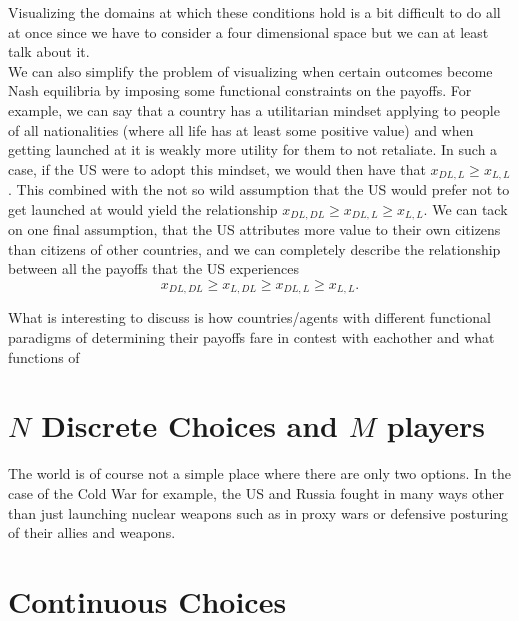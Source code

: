 \documentclass[11pt,english]{article}
\begin{document}
\noindent Visualizing the domains at which these conditions hold is a bit difficult to do all at once since we have to consider a four dimensional space but we can at least talk about it.\\

\noindent We can also simplify the problem of visualizing when certain outcomes become Nash equilibria by imposing some functional constraints on the payoffs. For example, we can say that a country has a utilitarian mindset applying to people of all nationalities (where all life has at least some positive value) and when getting launched at it is weakly more utility for them to not retaliate. In such a case, if the US were to adopt this mindset, we would then have that $x_{DL,L} \geq x_{L,L}$. This combined with the not so wild assumption that the US would prefer not to get launched at would yield the relationship $x_{DL,DL} \geq x_{DL,L} \geq x_{L,L}$. We can tack on one final assumption, that the US attributes more value to their own citizens than citizens of other countries, and we can completely describe the relationship between all the payoffs that the US experiences $$x_{DL,DL} \geq x_{L,DL} \geq x_{DL,L} \geq x_{L,L}.$$

\noindent What is interesting to discuss is how countries/agents with different functional paradigms of determining their payoffs fare in contest with eachother and what functions of 

\section*{$N$ Discrete Choices and $M$ players}

The world is of course not a simple place where there are only two options. In the case of the Cold War for example, the US and Russia fought in many ways other than just launching nuclear weapons such as in proxy wars or defensive posturing of their allies and weapons.


\section*{Continuous Choices}
\end{document}
